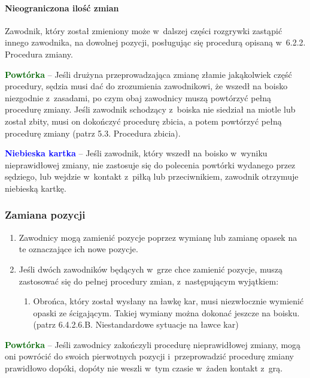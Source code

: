 \documentclass[12pt,a4paper]{article}
\newcommand\bluecard[1]{\bgroup\textcolor{blue}{\textbf{#1}}}
\newcommand\other[1]{\bgroup\textcolor{darkgreen}{\textbf{#1}}}
\begin{document}
\paragraph{Nieograniczona ilość zmian}
Zawodnik, który został
zmieniony może w~dalszej części rozgrywki zastąpić innego zawodnika, na
dowolnej pozycji, posługując się procedurą opisaną w~6.2.2. Procedura
zmiany.

\other{Powtórka} -- Jeśli drużyna przeprowadzająca zmianę złamie
jakąkolwiek część procedury, sędzia musi dać do zrozumienia zawodnikowi,
że wszedł na boisko niezgodnie z~zasadami, po czym obaj zawodnicy muszą
powtórzyć pełną procedurę zmiany. Jeśli zawodnik schodzący z~boiska nie
siedział na miotle lub został zbity, musi on dokończyć procedurę zbicia,
a potem powtórzyć pełną procedurę zmiany (patrz 5.3. Procedura zbicia).

\bluecard{Niebieska kartka} -- Jeśli zawodnik, który wszedł na boisko w~wyniku nieprawidłowej zmiany, nie zastosuje się do polecenia powtórki
wydanego przez sędziego, lub wejdzie w~kontakt z~piłką lub
przeciwnikiem, zawodnik otrzymuje niebieską kartkę.

\subsubsection{Zamiana pozycji}

\begin{enumerate}
	\item
	      Zawodnicy mogą zamienić pozycje poprzez wymianę lub zamianę opasek na
	      te oznaczające ich nowe pozycje.
	\item
	      Jeśli dwóch zawodników będących w~grze chce zamienić pozycje, muszą
	      zastosować się do pełnej procedury zmian, z~następującym wyjątkiem:

	      \begin{enumerate}
		      \item
		            Obrońca, który został wysłany na ławkę kar, musi niezwłocznie
		            wymienić opaski ze ścigającym. Takiej wymiany można dokonać jeszcze
		            na boisku. (patrz 6.4.2.6.B. Niestandardowe sytuacje na ławce kar)
	      \end{enumerate}
\end{enumerate}

\other{Powtórka} -- Jeśli zawodnicy zakończyli procedurę nieprawidłowej
zmiany, mogą oni powrócić do swoich pierwotnych pozycji i~przeprowadzić
procedurę zmiany prawidłowo dopóki, dopóty nie weszli w~tym czasie w~żaden kontakt z~grą.
\end{document}

